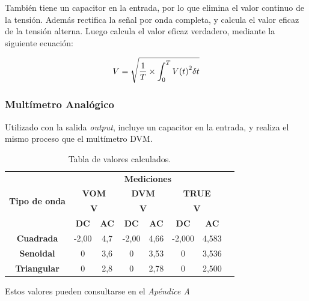 \documentclass{article}
\begin{document}
También tiene un capacitor en la entrada, por lo que elimina el valor continuo de la tensión. Además rectifica la señal por onda completa, y calcula el valor eficaz de la tensión alterna. Luego calcula el valor eficaz verdadero, mediante la siguiente ecuación:
\medskip

\begin{equation}
V = \sqrt{ {{1}\over{T}} \times \int_{0}^{T} {V(t)}^2 \delta t}
\end{equation}
\smallskip


\subsubsection{Multímetro Analógico}

Utilizado con la salida \textit{output}, incluye un capacitor en la entrada, y realiza el mismo proceso que el multímetro DVM.
\medskip


\begin{table}[!hbt]
	\begin{center}

		\begin{tabular}{|c|c|c|c|c|c|c|c|} \hline
			\multirow{4}{*}{\textbf{Tipo de onda}}

			& \multicolumn{6}{c|}{\textbf{Mediciones}} \\\cline{2-7}
			& \multicolumn{2}{c|}{\textbf{VOM}} & \multicolumn{2}{c|}{\textbf{DVM}} & \multicolumn{2}{c|}{\textbf{TRUE}} \\\cline{2-7}
			& \multicolumn{2}{c|}{\textbf{V}} & \multicolumn{2}{c|}{\textbf{V}} & \multicolumn{2}{c|}{\textbf{V}} \\\cline{2-7}
			& \textbf{DC} & \textbf{AC} & \textbf{DC} & \textbf{AC} & \textbf{DC} & \textbf{AC} \\\hline
			\textbf{Cuadrada} & -2,00 & 4,7  & -2,00 & 4,66 & -2,000 & 4,583 \\\hline
			\textbf{Senoidal} & 0 & 3,6 & 0 & 3,53 & 0 &  3,536 \\\hline
			\textbf{Triangular} & 0 & 2,8 & 0 & 2,78 & 0 & 2,500 \\\hline
		\end{tabular}

	\caption{Tabla de valores calculados.}
	\end{center}
\end{table}
\medskip

Estos valores pueden consultarse en el \textit{Apéndice A}\\\bigskip
\end{document}
